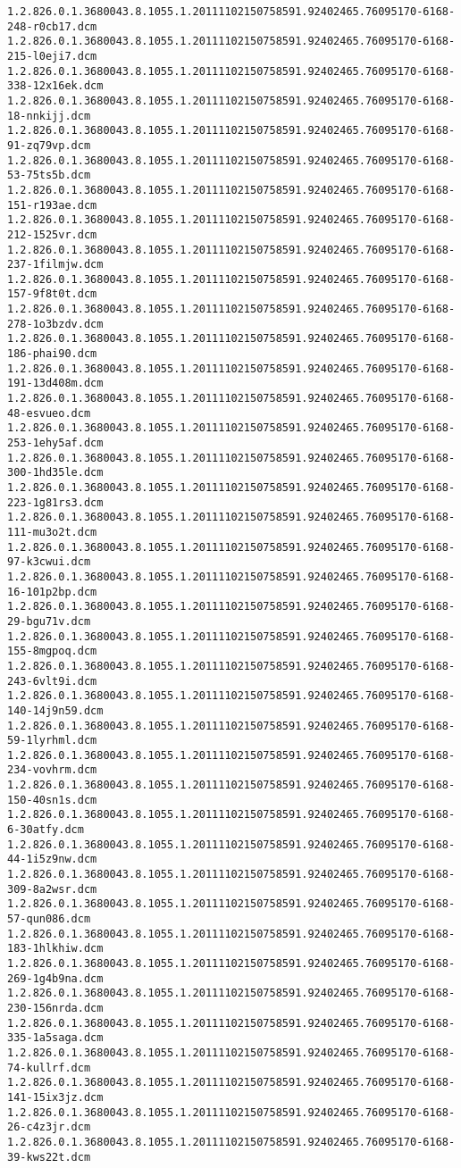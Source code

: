 \begin{lstlisting}
1.2.826.0.1.3680043.8.1055.1.20111102150758591.92402465.76095170-6168-248-r0cb17.dcm 1.2.826.0.1.3680043.8.1055.1.20111102150758591.92402465.76095170-6168-215-l0eji7.dcm 1.2.826.0.1.3680043.8.1055.1.20111102150758591.92402465.76095170-6168-338-12x16ek.dcm 1.2.826.0.1.3680043.8.1055.1.20111102150758591.92402465.76095170-6168-18-nnkijj.dcm 1.2.826.0.1.3680043.8.1055.1.20111102150758591.92402465.76095170-6168-91-zq79vp.dcm 1.2.826.0.1.3680043.8.1055.1.20111102150758591.92402465.76095170-6168-53-75ts5b.dcm 1.2.826.0.1.3680043.8.1055.1.20111102150758591.92402465.76095170-6168-151-r193ae.dcm 1.2.826.0.1.3680043.8.1055.1.20111102150758591.92402465.76095170-6168-212-1525vr.dcm 1.2.826.0.1.3680043.8.1055.1.20111102150758591.92402465.76095170-6168-237-1filmjw.dcm 1.2.826.0.1.3680043.8.1055.1.20111102150758591.92402465.76095170-6168-157-9f8t0t.dcm 1.2.826.0.1.3680043.8.1055.1.20111102150758591.92402465.76095170-6168-278-1o3bzdv.dcm 1.2.826.0.1.3680043.8.1055.1.20111102150758591.92402465.76095170-6168-186-phai90.dcm 1.2.826.0.1.3680043.8.1055.1.20111102150758591.92402465.76095170-6168-191-13d408m.dcm 1.2.826.0.1.3680043.8.1055.1.20111102150758591.92402465.76095170-6168-48-esvueo.dcm 1.2.826.0.1.3680043.8.1055.1.20111102150758591.92402465.76095170-6168-253-1ehy5af.dcm 1.2.826.0.1.3680043.8.1055.1.20111102150758591.92402465.76095170-6168-300-1hd35le.dcm 1.2.826.0.1.3680043.8.1055.1.20111102150758591.92402465.76095170-6168-223-1g81rs3.dcm 1.2.826.0.1.3680043.8.1055.1.20111102150758591.92402465.76095170-6168-111-mu3o2t.dcm 1.2.826.0.1.3680043.8.1055.1.20111102150758591.92402465.76095170-6168-97-k3cwui.dcm 1.2.826.0.1.3680043.8.1055.1.20111102150758591.92402465.76095170-6168-16-101p2bp.dcm 1.2.826.0.1.3680043.8.1055.1.20111102150758591.92402465.76095170-6168-29-bgu71v.dcm 1.2.826.0.1.3680043.8.1055.1.20111102150758591.92402465.76095170-6168-155-8mgpoq.dcm 1.2.826.0.1.3680043.8.1055.1.20111102150758591.92402465.76095170-6168-243-6vlt9i.dcm 1.2.826.0.1.3680043.8.1055.1.20111102150758591.92402465.76095170-6168-140-14j9n59.dcm 1.2.826.0.1.3680043.8.1055.1.20111102150758591.92402465.76095170-6168-59-1lyrhml.dcm 1.2.826.0.1.3680043.8.1055.1.20111102150758591.92402465.76095170-6168-234-vovhrm.dcm 1.2.826.0.1.3680043.8.1055.1.20111102150758591.92402465.76095170-6168-150-40sn1s.dcm 1.2.826.0.1.3680043.8.1055.1.20111102150758591.92402465.76095170-6168-6-30atfy.dcm 1.2.826.0.1.3680043.8.1055.1.20111102150758591.92402465.76095170-6168-44-1i5z9nw.dcm 1.2.826.0.1.3680043.8.1055.1.20111102150758591.92402465.76095170-6168-309-8a2wsr.dcm 1.2.826.0.1.3680043.8.1055.1.20111102150758591.92402465.76095170-6168-57-qun086.dcm 1.2.826.0.1.3680043.8.1055.1.20111102150758591.92402465.76095170-6168-183-1hlkhiw.dcm 1.2.826.0.1.3680043.8.1055.1.20111102150758591.92402465.76095170-6168-269-1g4b9na.dcm 1.2.826.0.1.3680043.8.1055.1.20111102150758591.92402465.76095170-6168-230-156nrda.dcm 1.2.826.0.1.3680043.8.1055.1.20111102150758591.92402465.76095170-6168-335-1a5saga.dcm 1.2.826.0.1.3680043.8.1055.1.20111102150758591.92402465.76095170-6168-74-kullrf.dcm 1.2.826.0.1.3680043.8.1055.1.20111102150758591.92402465.76095170-6168-141-15ix3jz.dcm 1.2.826.0.1.3680043.8.1055.1.20111102150758591.92402465.76095170-6168-26-c4z3jr.dcm 1.2.826.0.1.3680043.8.1055.1.20111102150758591.92402465.76095170-6168-39-kws22t.dcm 
\end{lstlisting}
